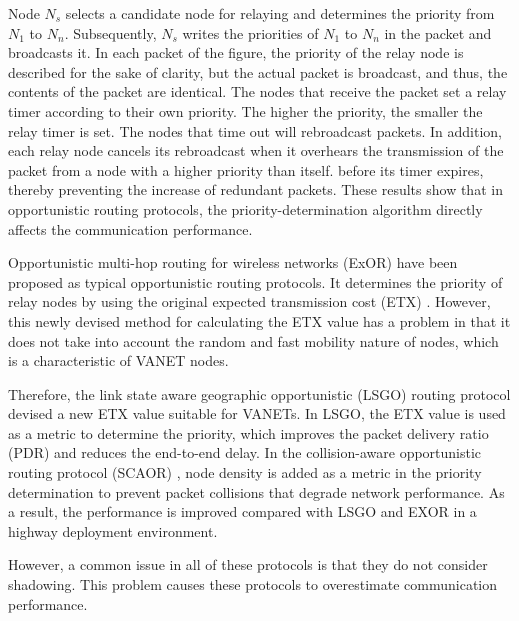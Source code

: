\documentclass[conference]{IEEEtran}
\begin{document}
Node $N_{s}$ selects a candidate node for relaying and determines the priority from $N_{1}$ to $N_{n}$. Subsequently, $N_{s}$ writes the priorities of $N_{1}$ to $N_{n}$ in the packet and broadcasts it. 
In each packet of the figure, the priority of the relay node is described for the sake of clarity, but the actual packet is broadcast, and thus, the contents of the packet are identical. 
The nodes that receive the packet set a relay timer according to their own priority.
The higher the priority, the smaller the relay timer is set.
The nodes that time out will rebroadcast packets.
In addition, each relay node cancels its rebroadcast when it overhears the transmission of the packet from a node with a higher priority than itself.
before its timer expires, thereby preventing the increase of redundant packets.
These results show that in opportunistic routing protocols, the priority-determination algorithm directly affects  the communication performance.


Opportunistic multi-hop routing for wireless networks (ExOR) \cite{16} have been proposed as typical opportunistic routing protocols. It determines the priority of relay nodes by using the original expected transmission cost (ETX) \cite{21}. However, this newly devised method for calculating the ETX value has a problem in that it does not take into account the random and fast mobility nature of nodes, which is a characteristic of VANET nodes.\par


Therefore, the link state aware geographic opportunistic (LSGO) routing protocol \cite{18} devised a new ETX value suitable for VANETs. In LSGO, the ETX value is used as a metric to determine the priority, which improves the packet delivery ratio (PDR) and reduces the end-to-end delay.
In the collision-aware opportunistic routing protocol (SCAOR) \cite{22}, node density is added as a metric in the priority determination to prevent packet collisions that degrade network performance. 
As a result, the performance is improved compared with LSGO and EXOR in a highway deployment environment. 

However, a  common issue in all of these protocols is that they do not consider shadowing.
This problem causes these protocols to overestimate communication performance. 
\end{document}
